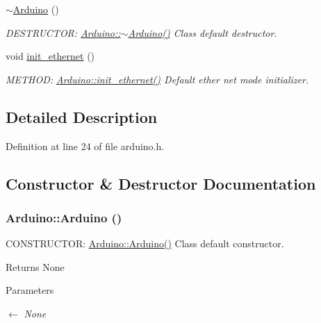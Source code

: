 \begin{DoxyCompactItemize}
\hyperlink{classArduino_a9e70a2c4fd95f0a432845209ec3b6c11_a9e70a2c4fd95f0a432845209ec3b6c11}{$\sim$Arduino} ()
\begin{DoxyCompactList}\small\item\em DESTRUCTOR: \hyperlink{classArduino_a9e70a2c4fd95f0a432845209ec3b6c11_a9e70a2c4fd95f0a432845209ec3b6c11}{Arduino::$\sim$Arduino()} Class default destructor. \item\end{DoxyCompactList}\item 
void \hyperlink{classArduino_a1839d0c9bcb7c8b7f3fef2d8ac9eaad0_a1839d0c9bcb7c8b7f3fef2d8ac9eaad0}{init\_\-ethernet} ()
\begin{DoxyCompactList}\small\item\em METHOD: \hyperlink{classArduino_a1839d0c9bcb7c8b7f3fef2d8ac9eaad0_a1839d0c9bcb7c8b7f3fef2d8ac9eaad0}{Arduino::init\_\-ethernet()} Default ether net mode initializer. \item\end{DoxyCompactList}\end{DoxyCompactItemize}


\subsection{Detailed Description}


Definition at line 24 of file arduino.h.

\subsection{Constructor \& Destructor Documentation}
\hypertarget{classArduino_a625b4d718e488c7a7c13593b8abf9a43_a625b4d718e488c7a7c13593b8abf9a43}{
\subsubsection[{Arduino}]{\setlength{\rightskip}{0pt plus 5cm}Arduino::Arduino ()}}
\label{classArduino_a625b4d718e488c7a7c13593b8abf9a43_a625b4d718e488c7a7c13593b8abf9a43}


CONSTRUCTOR: \hyperlink{classArduino_a625b4d718e488c7a7c13593b8abf9a43_a625b4d718e488c7a7c13593b8abf9a43}{Arduino::Arduino()} Class default constructor. \begin{DoxyReturn}{Returns}
None 
\end{DoxyReturn}

\begin{DoxyParams}{Parameters}
\item[\mbox{$\leftarrow$} {\em None}]\end{DoxyParams}


